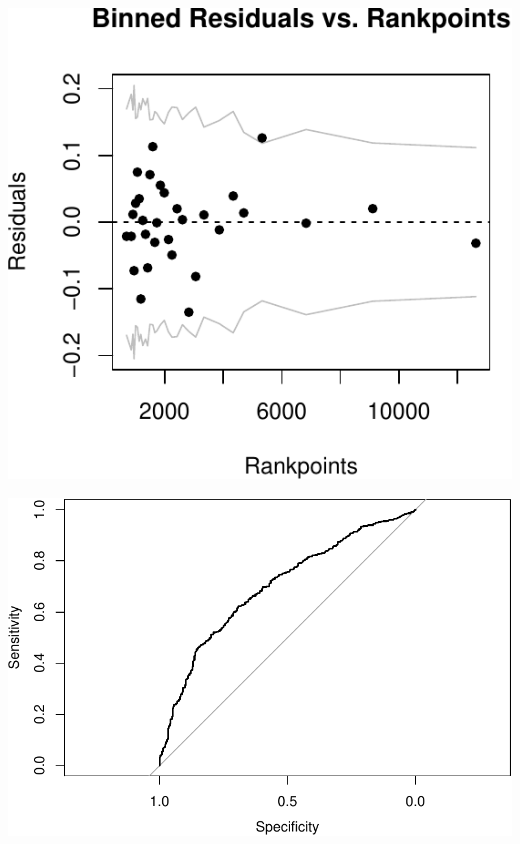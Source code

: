 \documentclass[]{article}
\newenvironment{Shaded}{\begin{snugshade}}{\end{snugshade}}
\newcommand{\DataTypeTok}[1]{\textcolor[rgb]{0.13,0.29,0.53}{#1}}
\newcommand{\KeywordTok}[1]{\textcolor[rgb]{0.13,0.29,0.53}{\textbf{#1}}}
\newcommand{\NormalTok}[1]{#1}
\newcommand{\OperatorTok}[1]{\textcolor[rgb]{0.81,0.36,0.00}{\textbf{#1}}}
\newcommand{\StringTok}[1]{\textcolor[rgb]{0.31,0.60,0.02}{#1}}
\begin{document}
\includegraphics{Project_files/figure-latex/unnamed-chunk-23-5.pdf}

\begin{Shaded}
\end{Shaded}

\includegraphics{Project_files/figure-latex/unnamed-chunk-24-1.pdf}
\end{document}
